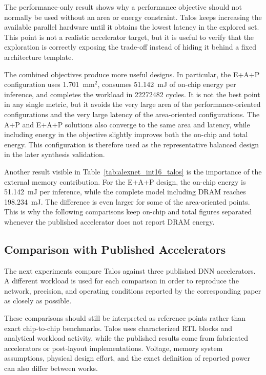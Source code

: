 The performance-only result shows why a performance objective should
not normally be used without an area or energy constraint. Talos keeps
increasing the available parallel hardware until it obtains the lowest
latency in the explored set. This point is not a realistic accelerator
target, but it is useful to verify that the exploration is correctly
exposing the trade-off instead of hiding it behind a fixed
architecture template.

The combined objectives produce more useful designs. In particular,
the E+A+P configuration uses 1.701~mm$^2$, consumes 51.142~mJ of
on-chip energy per inference, and completes the workload in 22272482
cycles. It is not the best point in any single metric, but it avoids the
very large area of the performance-oriented configurations and the very
large latency of the area-oriented configurations. The A+P and E+A+P
solutions also converge to the same area and latency, while including
energy in the objective slightly improves both the on-chip and total
energy. This configuration is therefore used as the representative
balanced design in the later synthesis validation.

Another result visible in Table~\ref{tab:alexnet_int16_talos} is the
importance of the external memory contribution. For the E+A+P design,
the on-chip energy is 51.142~mJ per inference, while the complete model
including DRAM reaches 198.234~mJ. The difference is even larger for
some of the area-oriented points. This is why the following comparisons
keep on-chip and total figures separated whenever the published
accelerator does not report DRAM energy.

\subsection{Comparison with Published Accelerators}

The next experiments compare Talos against three published DNN
accelerators. A different workload is used for each comparison in order
to reproduce the network, precision, and operating conditions reported
by the corresponding paper as closely as possible.

These comparisons should still be interpreted as reference points
rather than exact chip-to-chip benchmarks. Talos uses characterized RTL
blocks and analytical workload activity, while the published results
come from fabricated accelerators or post-layout implementations.
Voltage, memory system assumptions, physical design effort, and the
exact definition of reported power can also differ between works.

